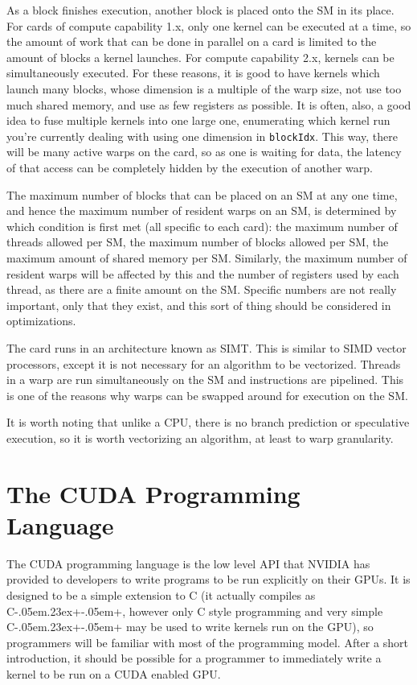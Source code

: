 \documentclass[a4paper,12pt]{report}
\def\CPP{{C\kern-.05em\raise.23ex\hbox{+\kern-.05em+}}}
\begin{document}
As a block finishes execution, another block is placed onto the SM in its place.
For cards of compute capability 1.x, only one kernel can be executed at a time, so the amount of work that can be done in parallel on a card is limited to the amount of blocks a kernel launches. For compute capability 2.x, kernels can be simultaneously executed.
For these reasons, it is good to have kernels which launch many blocks, whose dimension is a multiple of the warp size, not use too much shared memory, and use as few registers as possible.
It is often, also, a good idea to fuse multiple kernels into one large one, enumerating which kernel run you're currently dealing with using one dimension in \verb!blockIdx!.
This way, there will be many active warps on the card, so as one is waiting for data, the latency of that access can be completely hidden by the execution of another warp.

The maximum number of blocks that can be placed on an SM at any one time, and hence the maximum number of resident warps on an SM, is determined by which condition is first met (all specific to each card): the maximum number of threads allowed per SM, the maximum number of blocks allowed per SM, the maximum amount of shared memory per SM.
Similarly, the maximum number of resident warps will be affected by this and the number of registers used by each thread, as there are a finite amount on the SM.
Specific numbers are not really important, only that they exist, and this sort of thing should be considered in optimizations.

The card runs in an architecture known as SIMT.
This is similar to SIMD vector processors, except it is not necessary for an algorithm to be vectorized.
Threads in a warp are run simultaneously on the SM and instructions are pipelined.
This is one of the reasons why warps can be swapped around for execution on the SM.

It is worth noting that unlike a CPU, there is no branch prediction or speculative execution, so it is worth vectorizing an algorithm, at least to warp granularity.


\section{The CUDA Programming Language}
The CUDA programming language is the low level API that NVIDIA has provided to developers to write programs to be run explicitly on their GPUs\cite[p~21]{ KirkAndHwu}\cite[p~18]{ CUDA_C_Programming_Guide}.
It is designed to be a simple extension to C (it actually compiles as \CPP{}, however only C style programming and very simple \CPP{} may be used to write kernels run on the GPU), so programmers will be familiar with most of the programming model.
After a short introduction, it should be possible for a programmer to immediately write a kernel to be run on a CUDA enabled GPU.
\end{document}

